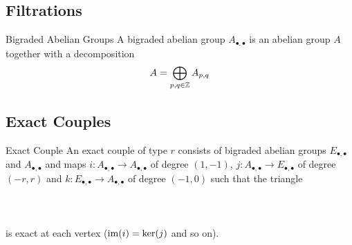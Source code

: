 \documentclass[a4paper]{article}
\begin{document}
\subsection{Filtrations}
\begin{defn}{Bigraded Abelian Groups}{} A bigraded abelian group $A_{\bullet,\bullet}$ is an abelian group $A$ together with a decomposition $$A=\bigoplus_{p,q\in\mathbb{Z}}A_{p,q}$$ 
\end{defn}

\subsection{Exact Couples}
\begin{defn}{Exact Couple}{} An exact couple of type $r$ consists of bigraded abelian groups $E_{\bullet,\bullet}$ and $A_{\bullet,\bullet}$ and maps $i:A_{\bullet,\bullet}\to A_{\bullet,\bullet}$ of degree $(1,-1)$, $j:A_{\bullet,\bullet}\to E_{\bullet,\bullet}$ of degree $(-r,r)$ and $k:E_{\bullet,\bullet}\to A_{\bullet,\bullet}$ of degree $(-1,0)$ such that the triangle \\~\\
\\~\\
is exact at each vertex ($\operatorname{im}(i)=\ker(j)$ and so on). 
\end{defn}
\end{document}
